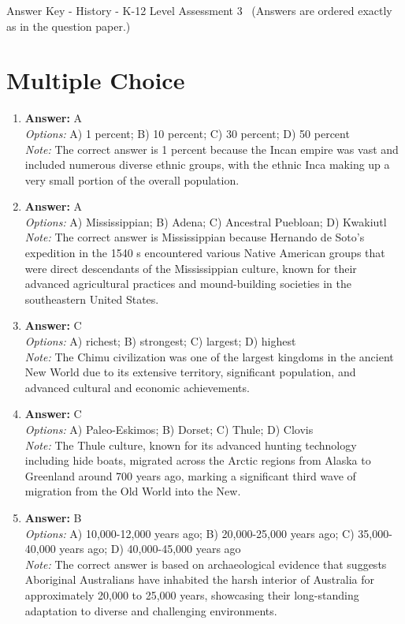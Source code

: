 \documentclass[12pt]{article}
\begin{document}
\begin{center}
Answer Key - History - K-12 Level Assessment 3 \
\small (Answers are ordered exactly as in the question paper.)
\end{center}

\section*{Multiple Choice}
\begin{enumerate}[label=\arabic*.]
\item \textbf{Answer:} A
\\ \textit{Options:} A) 1 percent; B) 10 percent; C) 30 percent; D) 50 percent
\\ \textit{Note:} The correct answer is 1 percent because the Incan empire was vast and included numerous diverse ethnic groups, with the ethnic Inca making up a very small portion of the overall population.
\item \textbf{Answer:} A
\\ \textit{Options:} A) Mississippian; B) Adena; C) Ancestral Puebloan; D) Kwakiutl
\\ \textit{Note:} The correct answer is Mississippian because Hernando de Soto's expedition in the 1540 s encountered various Native American groups that were direct descendants of the Mississippian culture, known for their advanced agricultural practices and mound-building societies in the southeastern United States.
\item \textbf{Answer:} C
\\ \textit{Options:} A) richest; B) strongest; C) largest; D) highest
\\ \textit{Note:} The Chimu civilization was one of the largest kingdoms in the ancient New World due to its extensive territory, significant population, and advanced cultural and economic achievements.
\item \textbf{Answer:} C
\\ \textit{Options:} A) Paleo-Eskimos; B) Dorset; C) Thule; D) Clovis
\\ \textit{Note:} The Thule culture, known for its advanced hunting technology including hide boats, migrated across the Arctic regions from Alaska to Greenland around 700 years ago, marking a significant third wave of migration from the Old World into the New.
\item \textbf{Answer:} B
\\ \textit{Options:} A) 10,000-12,000 years ago; B) 20,000-25,000 years ago; C) 35,000-40,000 years ago; D) 40,000-45,000 years ago
\\ \textit{Note:} The correct answer is based on archaeological evidence that suggests Aboriginal Australians have inhabited the harsh interior of Australia for approximately 20,000 to 25,000 years, showcasing their long-standing adaptation to diverse and challenging environments.
\end{enumerate}
\end{document}
